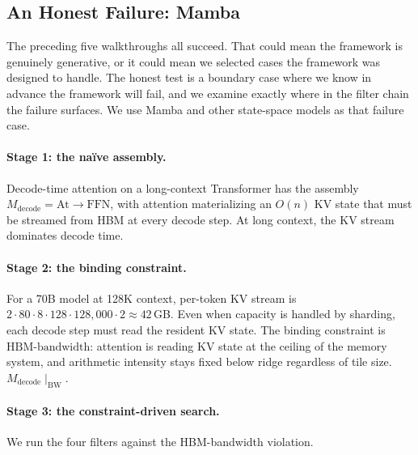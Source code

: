 \documentclass[10pt,twocolumn]{article}
\begin{document}
\subsection{An Honest Failure: Mamba}
\label{sec:mamba-failure}

The preceding five walkthroughs all succeed. That could mean the framework is genuinely generative, or it could mean we selected cases the framework was designed to handle. The honest test is a boundary case where we know in advance the framework will fail, and we examine exactly where in the filter chain the failure surfaces. We use Mamba and other state-space models as that failure case.

\paragraph{Stage 1: the na\"ive assembly.} Decode-time attention on a long-context Transformer has the assembly $M_{\text{decode}} = \text{At}\rightarrow \text{FFN}$, with attention materializing an $O(n)$ KV state that must be streamed from HBM at every decode step. At long context, the KV stream dominates decode time.

\paragraph{Stage 2: the binding constraint.} For a 70B model at 128K context, per-token KV stream is $2\cdot 80\cdot 8\cdot 128\cdot 128{,}000\cdot 2 \approx 42$\,GB. Even when capacity is handled by sharding, each decode step must read the resident KV state. The binding constraint is $\text{HBM-bandwidth}$: attention is reading KV state at the ceiling of the memory system, and arithmetic intensity stays fixed below ridge regardless of tile size. $M_{\text{decode}} \mid_{\text{BW}}$.

\paragraph{Stage 3: the constraint-driven search.} We run the four filters against the HBM-bandwidth violation.
\end{document}
